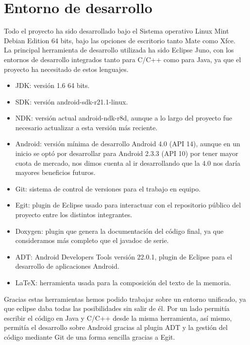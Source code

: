 \section{Entorno de desarrollo}
Todo el proyecto ha sido desarrollado bajo el Sistema operativo Linux Mint Debian Edition 64 bits, bajo las opciones de escritorio tanto Mate como Xfce.\\

La principal herramienta de desarrollo utilizada ha sido Eclipse Juno, con los entornos de desarrollo integrados tanto para C/C++ como para Java, ya que el proyecto ha necesitado de estos lenguajes.
\begin{itemize}
\item JDK: versión 1.6 64 bits.
\item SDK: versión android-sdk-r21.1-linux.
\item NDK: versión actual android-ndk-r8d, aunque a lo largo del proyecto fue necesario actualizar a esta versión más reciente.
\item Android: versión mínima de desarrollo Android 4.0 (API 14), aunque en un inicio se optó por desarrollar para Android 2.3.3 (API 10) por tener mayor cuota de mercado, nos dimos cuenta al ir desarrollando que la 4.0 nos daría mayores beneficios futuros.
\item Git: sistema de control de versiones para el trabajo en equipo.
\item Egit: plugin de Eclipse usado para interactuar con el repositorio público del proyecto entre los distintos integrantes.
\item Doxygen: plugin que genera la documentación del código final, ya que consideramos más completo que el javadoc de serie.
\item ADT: Android Developers Tools versión 22.0.1, plugin de Eclipse para el desarrollo de aplicaciones Android.
\item LaTeX: herramienta usada para la composición del texto de la memoria.\\
\end{itemize}

Gracias estas herramientas hemos podido trabajar sobre un entorno unificado, ya que eclipse daba todas las posibilidades sin salir de él. Por un lado permitía escribir el código en Java y C/C++ desde la misma herramienta, así mismo, permitía el desarrollo sobre Android gracias al plugin ADT y la gestión del código mediante Git de una forma sencilla gracias a Egit. 



